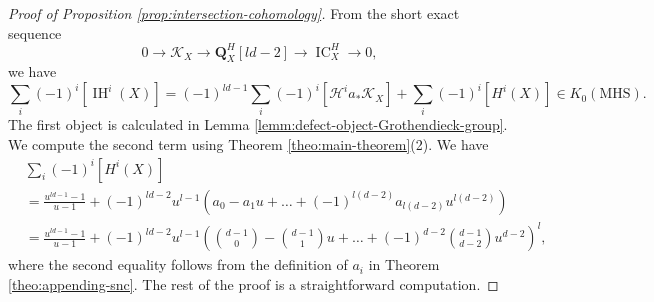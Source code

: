 \documentclass[10pt,a4paper]{amsart}
\DeclareMathOperator{\IC}{IC}
\DeclareMathOperator{\IH}{IH}
\newcommand{\QQ}{\mathbf{Q}}
\newcommand{\cH}{\mathcal{H}}
\newcommand{\cK}{\mathcal{K}}
\newcommand{\lsta}{_{*}}
\begin{document}
    \begin{proof}[Proof of Proposition \ref{prop:intersection-cohomology}]
        From the short exact sequence
        $$ 0 \to \cK_{X} \to \QQ_{X}^{H}[ld-2] \to \IC_{X}^{H} \to 0,$$
        we have
        $$ \sum_{i} (-1)^{i} [\IH^{i}(X)] = (-1)^{ld- 1} \sum_{i} (-1)^{i} [\cH^{i} a\lsta \cK_{X}] + \sum_{i} (-1)^{i} [H^{i}(X)] \in K_{0}(\mathrm{MHS}).$$
        The first object is calculated in Lemma \ref{lemm:defect-object-Grothendieck-group}. We compute the second term using Theorem \ref{theo:main-theorem}(2). We have
        \begin{align*}
            &\sum_{i} (-1)^{i} [H^{i}(X)] \\
            & = \frac{u^{ld-1}-1}{u-1} + (-1)^{ld-2} u^{l-1} (a_{0} - a_{1}u + \ldots + (-1)^{l(d-2)} a_{l(d-2)}u^{l(d-2)}) \\
            & = \frac{u^{ld-1}-1}{u-1} + (-1)^{ld-2} u^{l-1} \left( {d-1 \choose 0} - {d-1 \choose 1} u + \ldots + (-1)^{d-2} {d-1 \choose d-2} u^{d-2} \right)^{l},
        \end{align*}
        where the second equality follows from the definition of $a_{i}$ in Theorem \ref{theo:appending-snc}. The rest of the proof is a straightforward computation.
    \end{proof}
\end{document}
